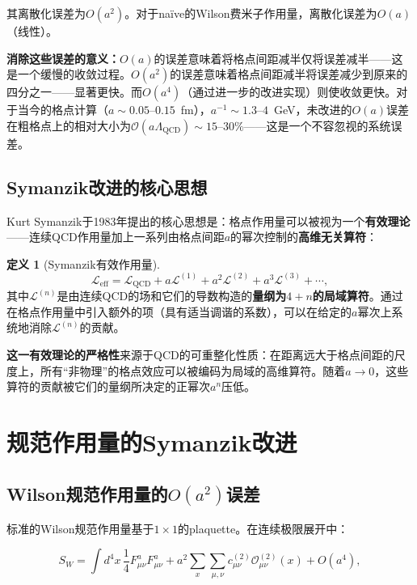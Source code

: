 \documentclass[12pt,a4paper]{ctexart}
\theoremstyle{definition}
\newtheorem{definition}{定义}[section]
\begin{document}
其离散化误差为$O(a^2)$。对于na\"ive的Wilson费米子作用量，离散化误差为$O(a)$（线性）。

\textbf{消除这些误差的意义：}$O(a)$的误差意味着将格点间距减半仅将误差减半——这是一个缓慢的收敛过程。$O(a^2)$的误差意味着格点间距减半将误差减少到原来的四分之一——显著更快。而$O(a^4)$（通过进一步的改进实现）则使收敛更快。对于当今的格点计算（$a \sim 0.05\text{--}0.15$~fm），$a^{-1} \sim 1.3\text{--}4$~GeV，未改进的$O(a)$误差在粗格点上的相对大小为$\mathcal{O}(a\Lambda_{\text{QCD}}) \sim 15\text{--}30\%$——这是一个不容忽视的系统误差。

\subsection{Symanzik改进的核心思想}

Kurt Symanzik于1983年提出的核心思想是：格点作用量可以被视为一个\textbf{有效理论}——连续QCD作用量加上一系列由格点间距$a$的幂次控制的\textbf{高维无关算符}：

\begin{definition}[Symanzik有效作用量]
\begin{equation}
\boxed{\mathcal{L}_{\text{eff}} = \mathcal{L}_{\text{QCD}} + a \mathcal{L}^{(1)} + a^2 \mathcal{L}^{(2)} + a^3 \mathcal{L}^{(3)} + \cdots},
\label{eq:Symanzik_effective_action}
\end{equation}
其中$\mathcal{L}^{(n)}$是由连续QCD的场和它们的导数构造的\textbf{量纲为$4+n$的局域算符}。通过在格点作用量中引入额外的项（具有适当调谐的系数），可以在给定的$a$幂次上系统地消除$\mathcal{L}^{(n)}$的贡献。
\end{definition}

\textbf{这一有效理论的严格性}来源于QCD的可重整化性质：在距离远大于格点间距的尺度上，所有``非物理''的格点效应可以被编码为局域的高维算符。随着$a \to 0$，这些算符的贡献被它们的量纲所决定的正幂次$a^n$压低。

\section{规范作用量的Symanzik改进}

\subsection{Wilson规范作用量的$O(a^2)$误差}

标准的Wilson规范作用量基于$1\times1$的plaquette。在连续极限展开中\cite{CLQCD2025quark_mass}：

\begin{equation}
S_W = \int d^4x\, \frac{1}{4}F^a_{\mu\nu}F^a_{\mu\nu} + a^2 \sum_x \sum_{\mu,\nu} c^{(2)}_{\mu\nu} \mathcal{O}^{(2)}_{\mu\nu}(x) + O(a^4),
\end{equation}
\end{document}

